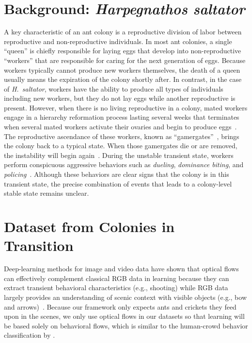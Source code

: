 \documentclass[letterpaper]{article} %
\begin{document}
\section{Background: \emph{Harpegnathos saltator}}
\label{sec:background}

A key characteristic of an ant colony is a reproductive division of
labor between reproductive and non-reproductive individuals.
In most ant colonies, a single ``queen'' is chiefly responsible for
laying eggs that develop into non-reproductive ``workers'' that
are responsible for caring for the next generation of eggs.
Because workers typically cannot produce
new workers themselves, the death of a queen usually means the
expiration of the colony shortly after.
In contrast, in the case of \emph{H.~saltator}, workers
have the ability to produce all types of individuals including new
workers,
but they do not lay eggs while another
reproductive is present. However, when there is no living reproductive
in a colony, mated workers engage in a hierarchy reformation process
lasting several weeks that terminates when several mated workers activate
their ovaries and begin to produce eggs~\citep{LPH99, SPSHPL16}. The
reproductive ascendance of these workers, known as
``gamergates''~\citep{PC85}, brings the colony back to a typical state.
When those gamergates die or are removed, the instability will begin
again~\citep{LPH99, SPSHPL16}.
During the unstable transient state, workers perform conspicuous aggressive
behaviors such as \emph{dueling}, \emph{dominance biting}, and
\emph{policing}~\citep{SPSHPL16}.
Although these behaviors are clear signs that the colony is in
this transient state, the precise combination of events that
leads to a colony-level stable state remains unclear.



\section{Dataset from Colonies in Transition}
\label{sec:dataset}

Deep-learning methods for image and video data have shown that optical
flows can effectively complement classical RGB data in learning because
they can extract transient behavioral characteristics (e.g., shooting)
while RGB data largely provides an understanding of scenic context with
visible objects (e.g., bow and arrows)~\citep{SZ14}. Because our
framework only expects ants and crickets they feed upon in
the scenes, we only use optical flows in our datasets so that learning
will be based solely on behavioral flows, which is similar to
the human-crowd behavior classification by \citet{MOS09}.
\end{document}
